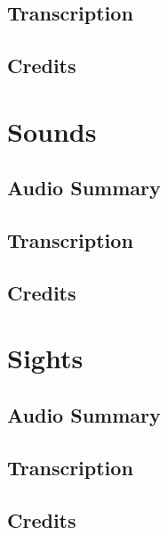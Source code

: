 \subsection{Transcription}

\subsection{Credits}

\section{Sounds}

\subsection{Audio Summary}

\subsection{Transcription}

\subsection{Credits}

\section{Sights}

\subsection{Audio Summary}

\subsection{Transcription}

\subsection{Credits}